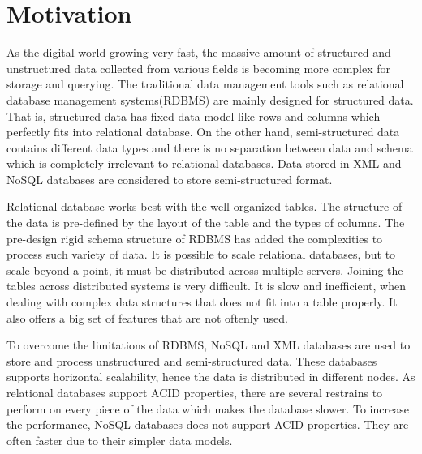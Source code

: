 
\section{Motivation}
		\label{motivation}
		    As the digital world growing very fast, the massive amount of structured and unstructured data collected from various fields is becoming more complex for storage and querying. The traditional data management tools such as relational database management systems(RDBMS) are mainly designed for structured data. That is, structured data has fixed data model like rows and columns which perfectly fits into relational database. On the other hand, semi-structured data contains different data types and there is no separation between data and schema which is completely irrelevant to relational databases. Data stored in XML and NoSQL databases are considered to store semi-structured format.
		\par
		 Relational database works best with the well organized tables. The structure of the data is pre-defined by the layout of the table and the types of columns. The pre-design rigid schema structure of RDBMS has added the complexities to process such variety of data. It is possible to scale relational databases, but to scale beyond a point, it must be distributed across multiple servers. Joining the tables across distributed systems is very difficult. It is slow and inefficient, when dealing with complex data structures that does not fit into a table properly. It also offers a big set of features that are not oftenly used.
	\par
	To overcome the limitations of RDBMS, NoSQL and XML databases are used to store and process unstructured and semi-structured data. These databases supports horizontal scalability, hence the data is distributed in different nodes. As relational databases support ACID properties, there are several restrains to perform on every piece of the data which makes the database slower. To increase the performance, NoSQL databases does not support ACID properties. They are often faster due to their simpler data models.  
